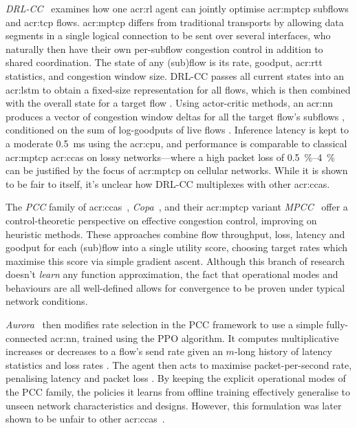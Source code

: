 \emph{DRL-CC}~\parencite{DBLP:journals/jsac/XuTYWX19} examines how one \gls{acr:rl} agent can jointly optimise \gls{acr:mptcp} subflows and \gls{acr:tcp} flows.
\gls{acr:mptcp} differs from traditional transports by allowing data segments in a single logical connection to be sent over several interfaces, who naturally then have their own per-subflow congestion control in addition to shared coordination.
The state of any (sub)flow is its rate, goodput, \gls{acr:rtt} statistics, and congestion window size.
DRL-CC passes all current states into an \gls{acr:lstm} to obtain a fixed-size representation for all flows, which is then combined with the overall state for a target flow \prllitstate.
Using actor-critic methods, an \gls{acr:nn} produces a vector of congestion window deltas for all the target flow's subflows \prllitactreal, conditioned on the sum of log-goodputs of live flows \prllitreward.
Inference latency is kept to a moderate \qty{0.5}{\milli\second} using the \gls{acr:cpu}, and performance is comparable to classical \gls{acr:mptcp} \glspl{acr:cca} on lossy networks---where a high packet loss of \qtyrange{0.5}{4}{\percent} can be justified by the focus of \gls{acr:mptcp} on cellular networks.
While it is shown to be fair to itself, it's unclear how DRL-CC multiplexes with other \glspl{acr:cca}.

The \emph{PCC} family of \glspl{acr:cca}~\parencite{DBLP:conf/nsdi/DongLZGS15,DBLP:conf/nsdi/DongMZAGGS18}, \emph{Copa}~\parencite{DBLP:conf/nsdi/ArunB18}, and their \gls{acr:mptcp} variant \emph{MPCC}~\parencite{DBLP:conf/conext/GiladSGRS20} offer a control-theoretic perspective on effective congestion control, improving on heuristic methods.
These approaches combine flow throughput, loss, latency and goodput for each (sub)flow into a single utility score, choosing target rates which maximise this score via simple gradient ascent.
Although this branch of research doesn't \emph{learn} any function approximation, the fact that operational modes and behaviours are all well-defined allows for convergence to be proven under typical network conditions.

\emph{Aurora}~\parencite{DBLP:conf/icml/JayRGST19} then modifies rate selection in the PCC framework to use a simple fully-connected \gls{acr:nn}, trained using the PPO algorithm.
It computes multiplicative increases or decreases to a flow's send rate \prllitactreal{} given an $m$-long history of latency statistics and loss rates \prllitstate.
The agent then acts to maximise packet-per-second rate, penalising latency and packet loss \prllitreward.
By keeping the explicit operational modes of the PCC family, the policies it learns from offline training effectively generalise to unseen network characteristics and designs.
However, this formulation was later shown to be unfair to other \glspl{acr:cca}~\parencite{DBLP:conf/sigcomm/AbbaslooYC20}.


